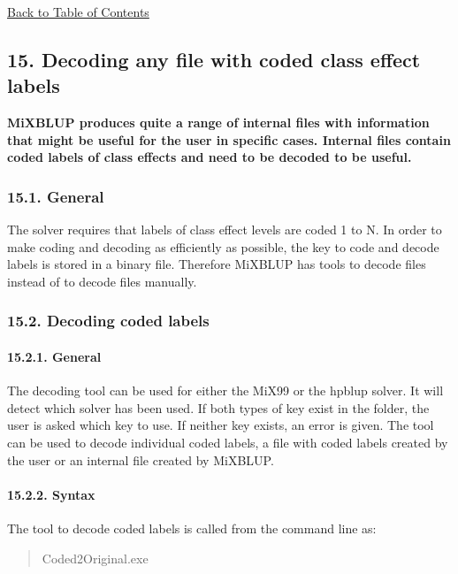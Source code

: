\hyperref[Tabl01]{Back to Table of Contents}

\newpage

\subsection{15. Decoding any file with coded class effect
labels}\label{Deco01}

\textbf{MiXBLUP produces quite a range of internal files with
information that might be useful for the user in specific cases.
Internal files contain coded labels of class effects and need to be
decoded to be useful.}

\subsubsection{15.1. General}\label{Deco02}

The solver requires that labels of class effect levels are coded 1 to N.
In order to make coding and decoding as efficiently as possible, the key
to code and decode labels is stored in a binary file. Therefore MiXBLUP
has tools to decode files instead of to decode files manually.

\subsubsection{15.2. Decoding coded labels}\label{Deco03}

\paragraph{15.2.1. General}\label{Deco04}

The decoding tool can be used for either the MiX99 or the hpblup solver.
It will detect which solver has been used. If both types of key exist in
the folder, the user is asked which key to use. If neither key exists,
an error is given. The tool can be used to decode individual coded
labels, a file with coded labels created by the user or an internal file
created by MiXBLUP.

\paragraph{15.2.2. Syntax}\label{Deco05}

The tool to decode coded labels is called from the command line as:

\begin{quote}
Coded2Original.exe
\end{quote}


